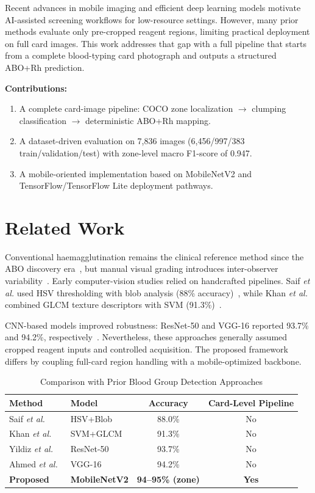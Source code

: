\documentclass[conference]{IEEEtran}
\begin{document}
Recent advances in mobile imaging and efficient deep learning models motivate AI-assisted screening workflows for low-resource settings. However, many prior methods evaluate only pre-cropped reagent regions, limiting practical deployment on full card images. This work addresses that gap with a full pipeline that starts from a complete blood-typing card photograph and outputs a structured ABO+Rh prediction.

\textbf{Contributions:}
\begin{enumerate}
  \item A complete card-image pipeline: COCO zone localization $\rightarrow$ clumping classification $\rightarrow$ deterministic ABO+Rh mapping.
  \item A dataset-driven evaluation on 7,836 images (6,456/997/383 train/validation/test) with zone-level macro F1-score of 0.947.
  \item A mobile-oriented implementation based on MobileNetV2 and TensorFlow/TensorFlow Lite deployment pathways.
\end{enumerate}

\section{Related Work}
Conventional haemagglutination remains the clinical reference method since the ABO discovery era~\cite{landsteiner1901}, but manual visual grading introduces inter-observer variability~\cite{harmening2019}. Early computer-vision studies relied on handcrafted pipelines. Saif \emph{et al.} used HSV thresholding with blob analysis (88\% accuracy)~\cite{saif2016}, while Khan \emph{et al.} combined GLCM texture descriptors with SVM (91.3\%)~\cite{khan2018}.

CNN-based models improved robustness: ResNet-50 and VGG-16 reported 93.7\% and 94.2\%, respectively~\cite{yildiz2020,ahmed2021}. Nevertheless, these approaches generally assumed cropped reagent inputs and controlled acquisition. The proposed framework differs by coupling full-card region handling with a mobile-optimized backbone.

\begin{table}[htbp]
  \caption{Comparison with Prior Blood Group Detection Approaches}
  \label{tab:comparison}
  \centering
  \renewcommand{\arraystretch}{1.1}
  \begin{tabular}{lp{1.6cm}cc}
    \toprule
    \textbf{Method} & \textbf{Model} & \textbf{Accuracy} & \textbf{Card-Level Pipeline} \\
    \midrule
    Saif \emph{et al.}~\cite{saif2016} & HSV+Blob & 88.0\% & No \\
    Khan \emph{et al.}~\cite{khan2018} & SVM+GLCM & 91.3\% & No \\
    Yildiz \emph{et al.}~\cite{yildiz2020} & ResNet-50 & 93.7\% & No \\
    Ahmed \emph{et al.}~\cite{ahmed2021} & VGG-16 & 94.2\% & No \\
    \textbf{Proposed} & \textbf{MobileNetV2} & \textbf{94--95\% (zone)} & \textbf{Yes} \\
    \bottomrule
  \end{tabular}
\end{table}
\end{document}
